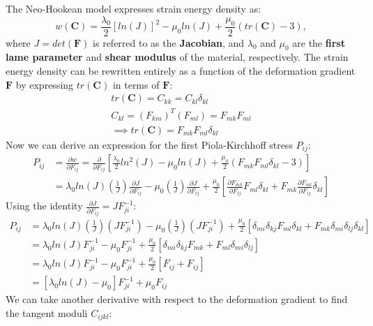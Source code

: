 \documentclass[]{spie}  %
\begin{document}
The Neo-Hookean model expresses strain energy density as:
\begin{equation}
\label{eq: strain energy density}
w(\bm{C}) = \frac{\lambda_0}{2}[ln(J)]^2 - \mu_0 ln(J) + \frac{\mu_0}{2}(tr(\bm{C}) - 3),
\end{equation}
where $J = det(\bm{F})$ is referred to as the \textbf{Jacobian}, and $\lambda_0$ and $\mu_0$ are the \textbf{first lame parameter} and \textbf{shear modulus} of the material, respectively. The strain energy density can be rewritten entirely as a function of the deformation gradient $\bm{F}$ by expressing $tr(\bm{C})$ in terms of $\bm{F}$:
\begin{gather*}
tr(\bm{C}) = C_{kk} = C_{kl}\delta_{kl} \\
C_{kl} = (F_{km})^T(F_{ml}) = F_{mk}F_{ml} \\
\implies tr(\bm{C}) = F_{mk}F_{ml}\delta_{kl}
\end{gather*}
Now we can derive an expression for the first Piola-Kirchhoff stress $P_{ij}$:
\begin{align}
P_{ij} 	&= \frac{\partial w}{\partial F_{ij}} = \frac{\partial}{\partial F_{ij}} \left[\frac{\lambda_0}{2}ln^2(J) - \mu_0 ln(J) + \frac{\mu_0}{2}(F_{mk}F_{ml}\delta_{kl} - 3)\right] \\
		&= \lambda_0 ln(J) \left(\frac{1}{J}\right) \frac{\partial J}{\partial F_{ij}} - \mu_0 \left(\frac{1}{J}\right) \frac{\partial J}{\partial F_{ij}} + \frac{\mu_0}{2} \left[\frac{\partial F_{mk}}{\partial F_{ij}} F_{ml} \delta_{kl} + F_{mk} \frac{\partial F_{ml}}{\partial F_{ij}} \delta_{kl}\right]
\end{align}
Using the identity $\frac{\partial J}{\partial F_{ij}} = J F^{-1}_{ji}$:
\begin{align}
P_{ij} 	&= \lambda_0 ln(J) \left(\frac{1}{J}\right) (J F^{-1}_{ji}) - \mu_0 \left(\frac{1}{J}\right) (J F^{-1}_{ji}) + \frac{\mu_0}{2} \left[\delta_{mi}\delta_{kj} F_{ml} \delta_{kl} + F_{mk} \delta_{mi}\delta_{lj} \delta_{kl}\right] \\
		&= \lambda_0 ln(J) F^{-1}_{ji} - \mu_0 F^{-1}_{ji} + \frac{\mu_0}{2} \left[\delta_{mi}\delta_{kj} F_{mk} + F_{ml} \delta_{mi}\delta_{lj}\right] \\
		&= \lambda_0 ln(J) F^{-1}_{ji} - \mu_0 F^{-1}_{ji} + \frac{\mu_0}{2} \left[F_{ij} + F_{ij}\right] \\
		&= \left[\lambda_0 ln(J) - \mu_0 \right]F^{-1}_{ji} + \mu_0 F_{ij}
\end{align}
We can take another derivative with respect to the deformation gradient to find the tangent moduli $C_{ijkl}$:
\end{document}
